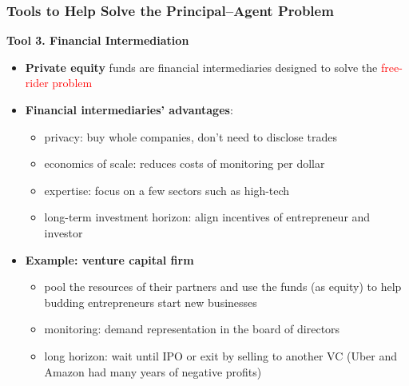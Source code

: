 \documentclass[aspectratio=169]{beamer}
\begin{document}
\begin{frame}
\frametitle{Tools to Help Solve the Principal–Agent Problem}


\textbf{Tool 3. Financial Intermediation} 
    \medskip
\begin{itemize}
    \item \textbf{Private equity} funds are financial intermediaries designed to solve the \textcolor{red}{free-rider problem} 
    \medskip
    \item \textbf{Financial intermediaries' advantages}: \pause 
    \begin{itemize}
        \item privacy: buy whole companies, don't need to disclose trades
        \item economics of scale: reduces costs of monitoring per dollar
        \item expertise: focus on a few sectors such as high-tech
        \item long-term investment horizon: align incentives of entrepreneur and investor  
    \end{itemize} \pause 
    \medskip
    \item \textbf{Example: venture capital firm} \pause 
    \begin{itemize}
        \item pool the resources of their partners and use the funds (as equity) to help budding entrepreneurs start new businesses
        \item monitoring: demand representation in the board of directors
        \item long horizon: wait until IPO or exit by selling to another VC (Uber and Amazon had many years of negative profits)
    \end{itemize}
\end{itemize}


\end{frame}
\end{document}
